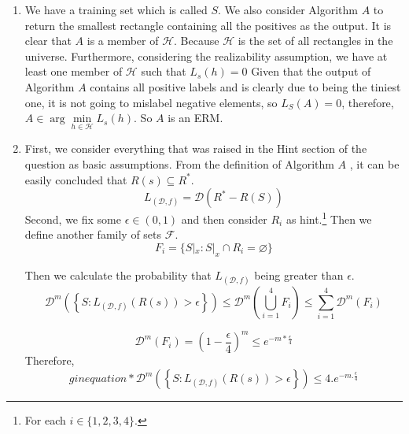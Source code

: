 \documentclass[]{book}
\theoremstyle{definition}
\begin{document}
\begin{enumerate}
    \item We have a training set which is called $S$. We also consider Algorithm $A$ to return the smallest rectangle containing all the positives as the output. It is clear that $A$ is a member of $\mathcal{H}$. Because $\mathcal{H}$ is the set of all rectangles in the universe. Furthermore, considering the  realizability assumption, we have at least one member of $\mathcal{H}$ such that $ L_s (h) = 0 $ Given that the output of Algorithm $A$ contains all positive labels and is clearly due to being the tiniest one, it is not going to mislabel negative elements, so $ L_S (A) = 0 $, therefore, $A \in \arg \underset{h \in \mathcal{H}}{\min} L_s(h)$. So $A$ is an ERM.
    \item     First, we consider everything that was raised in the Hint section of the question as basic assumptions. From the definition of Algorithm $A$ , it can be easily concluded that $ R(s) \subseteq R^* $.
    \begin{equation*}
        L_{(\mathcal{D},f)}=\mathcal{D}(R^*-R(S))
    \end{equation*}
    Second, we fix some $\epsilon \in (0,1)$ and then consider $R_i$ as hint.\footnote{For each $i\in \{1,2,3,4\}$.} Then we define another family of sets $\mathcal{F}$.
    \begin{equation*}
        F_i=\{S|_x:S|_x \cap R_i = \varnothing \}
    \end{equation*}
    
    Then we calculate the probability that $L_{(\mathcal{D},f)}$ being greater than $\epsilon$.
    \begin{equation*}
        \mathcal{D}^m \left ( \left \{  S:   L_{(\mathcal{D},f)}(R(s))>\epsilon \right \} \right ) \leq \mathcal{D}^m \left ( \bigcup_{i=1}^{4} F_i \right ) \leq \sum_{i=1}^{4} \mathcal{D}^m \left ( F_i \right )
    \end{equation*}
    

    \begin{equation*}
        \mathcal{D}^m(F_i)=(1-\frac{\epsilon}{4})^m \leq e^{-m*\frac{\epsilon}{4}}
    \end{equation*}
    Therefore,
    \begin{equation*}
        gin{equation*}
        \mathcal{D}^m \left ( \left \{  S:   L_{(\mathcal{D},f)}(R(s))>\epsilon \right \} \right ) \leq 4.e^{-m.\frac{\epsilon}{4}}
    \end{equation*}
    

\end{enumerate}
\end{document}
